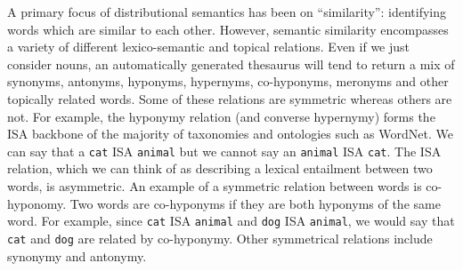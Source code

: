 \documentclass[11pt]{article}
\begin{document}
A primary focus of distributional semantics has been on ``similarity'': identifying words which are similar to each other. However, semantic similarity encompasses a variety of different lexico-semantic and topical relations.  Even if we just consider nouns, an automatically generated thesaurus will tend to return a mix of synonyms, antonyms, hyponyms, hypernyms, co-hyponyms, meronyms and other topically related words.  Some of these relations are symmetric whereas others are not.  For example, the hyponymy relation (and converse hypernymy) forms the ISA backbone of the majority of taxonomies and ontologies such as WordNet.  We can say that a \texttt{cat} ISA \texttt{animal}  but we cannot say an \texttt{animal} ISA \texttt{cat}.  The ISA relation, which we can think of  as describing a lexical entailment \cite{Geffet2005}  between two words, is asymmetric. An example of a symmetric relation between words is co-hyponomy. Two words are co-hyponyms if they are both hyponyms of the same word.  For example, since \texttt{cat} ISA \texttt{animal} and \texttt{dog} ISA \texttt{animal}, we would say that \texttt{cat} and \texttt{dog} are related by co-hyponymy.  Other symmetrical relations include synonymy and antonymy. 
\end{document}
